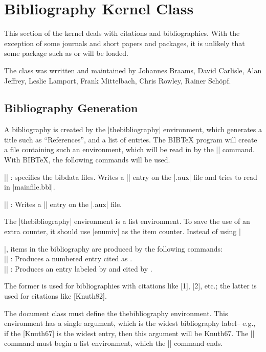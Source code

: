 \chapter{Bibliography Kernel Class}
  
  This section of the kernel deals with citations and bibliographies. With the exception of some journals and
  short papers and packages, it is unlikely that some package such as  or 
  will be loaded.
  
  The class was wrritten and maintained by Johannes Braams,
  David Carlisle,
  Alan Jeffrey,
  Leslie Lamport,
  Frank Mittelbach,
  Chris Rowley,
  Rainer Sch\"opf.



 \section{Bibliography Generation}

  A bibliography is created by the |thebibliography| environment, which
  generates a title such as ``References'', and a list of entries.
  The BIB\TeX{} program will create a file containing such an
  environment, which will be read in by the || command.
  With BIB\TeX, the following commands will be used.

 \DescribeMacro{}
  || : specifies
     the bibdata files.  Writes a |\bibdata| entry on the |.aux| file
     and tries to read in |mainfile.bbl|.

 \DescribeMacro{}
  || :
     Writes a |\bibstyle| entry on the |.aux| file.

  The |thebibliography| environment is a list environment.  To save the
  use of an extra counter, it should use  |enumiv|  as the item
  counter.
  Instead of using |\item|, items in the bibliography are produced by
  the  following commands:\\
    |\bibitem|    : Produces a numbered entry cited as
    .\\
    |\bibitem| : Produces an entry labeled by
     and cited by .

  The former is used for bibliographies with citations like [1], [2],
  etc.;
  the latter is used for citations like [Knuth82].

  The document class must define the thebibliography environment.  This
  environment has a single argument, which is the widest bibliography
  label-- e.g., if the [Knuth67] is the widest entry, then this
  argument will be Knuth67.  The |\thebibliography| command must begin
  a list  environment, which the |\endthebibliography| command ends.


